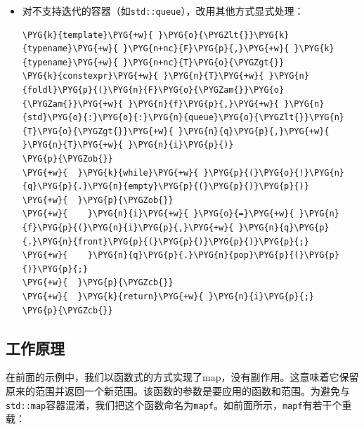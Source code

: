 \begin{itemize}

\item 对不支持迭代的容器（如\texttt{std::\allowbreak{}queue}），改用其他方式显式处理：



\begin{codeblockbg}
\begin{Verbatim}[commandchars=\\\{\},breaklines=true,breakanywhere=true,fontsize=\codefont,xleftmargin=17bp]
\PYG{k}{template}\PYG{+w}{ }\PYG{o}{\PYGZlt{}}\PYG{k}{typename}\PYG{+w}{ }\PYG{n+nc}{F}\PYG{p}{,}\PYG{+w}{ }\PYG{k}{typename}\PYG{+w}{ }\PYG{n+nc}{T}\PYG{o}{\PYGZgt{}}
\PYG{k}{constexpr}\PYG{+w}{ }\PYG{n}{T}\PYG{+w}{ }\PYG{n}{foldl}\PYG{p}{(}\PYG{n}{F}\PYG{o}{\PYGZam{}}\PYG{o}{\PYGZam{}}\PYG{+w}{ }\PYG{n}{f}\PYG{p}{,}\PYG{+w}{ }\PYG{n}{std}\PYG{o}{:}\PYG{o}{:}\PYG{n}{queue}\PYG{o}{\PYGZlt{}}\PYG{n}{T}\PYG{o}{\PYGZgt{}}\PYG{+w}{ }\PYG{n}{q}\PYG{p}{,}\PYG{+w}{ }\PYG{n}{T}\PYG{+w}{ }\PYG{n}{i}\PYG{p}{)}
\PYG{p}{\PYGZob{}}
\PYG{+w}{  }\PYG{k}{while}\PYG{+w}{ }\PYG{p}{(}\PYG{o}{!}\PYG{n}{q}\PYG{p}{.}\PYG{n}{empty}\PYG{p}{(}\PYG{p}{)}\PYG{p}{)}
\PYG{+w}{  }\PYG{p}{\PYGZob{}}
\PYG{+w}{    }\PYG{n}{i}\PYG{+w}{ }\PYG{o}{=}\PYG{+w}{ }\PYG{n}{f}\PYG{p}{(}\PYG{n}{i}\PYG{p}{,}\PYG{+w}{ }\PYG{n}{q}\PYG{p}{.}\PYG{n}{front}\PYG{p}{(}\PYG{p}{)}\PYG{p}{)}\PYG{p}{;}
\PYG{+w}{    }\PYG{n}{q}\PYG{p}{.}\PYG{n}{pop}\PYG{p}{(}\PYG{p}{)}\PYG{p}{;}
\PYG{+w}{  }\PYG{p}{\PYGZcb{}}
\PYG{+w}{  }\PYG{k}{return}\PYG{+w}{ }\PYG{n}{i}\PYG{p}{;}
\PYG{p}{\PYGZcb{}}
\end{Verbatim}
\end{codeblockbg}


\end{itemize}



\subsection{工作原理}



在前面的示例中，我们以函数式的方式实现了map，没有副作用。这意味着它保留原来的范围并返回一个新范围。该函数的参数是要应用的函数和范围。为避免与\texttt{std::\allowbreak{}map}容器混淆，我们把这个函数命名为\texttt{mapf}。如前面所示，\texttt{mapf}有若干个重载：



